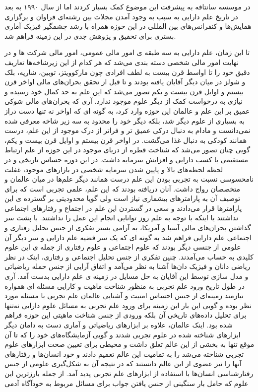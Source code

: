 \documentclass[a4paper,titlepage,12pt,fleqn,oneside]{report}
\begin{document}
در موسسه سانتافه\cite{santa}  به پیشرفت این موضوع کمک بسیار کردند اما از سال ۱۹۹۰ به بعد در تاریخ علم دارایی به سبب به وجود آمدن مجلات بین رشته‌ای فراوان و برگزاری همایش‌ها و کنفرانس‌های بین المللی در این حوزه همراه با رشد چشمگیر فیزیک آماری بستری برای تحقیق و پژوهش جدی در این زمینه فراهم شد.  




تا این زمان، علم  دارایی به سه طبقه ی امور مالی عمومی، امور مالی شرکت ها و در نهایت امور مالی شخصی دسته بندی می‌شد که هر کدام از این زیرشاخه‌ها تعاریف دقیق خود را تا اواسط قرن بیست به لطف افرادی چون مارکوویتز، توبین، شارپه، بلک و شولز در میان دیگر آقایان یافته بودند و تا قبل از تحقق بحران‌های مالی اواخر قرن بیستم و اوایل قرن بیست و یکم تصور می‌شد که این علم به حد کمال خود رسیده و نیازی به درخواست کمک از دیگر علوم موجود ندارد. آری که بحران‌های مالی شوکی عمیق بر این علم و عالمان این حوزه وارد کرد، به گونه ای که اواخر نه تنها دست دراز به بسیاری از علوم دیگر شد، بلکه دیگر خود را محدود به سه زیر شاخه معرفی شده نمی‌دانست و مادام به دنبال درکی عمیق تر و فراتر از درک موجود از این علم، درست همانند کودکی به دنبال غذا می‌گشت. در اواخر قرن بیستم و اوایل قرن بیست و یکم، گویی چنان تصور می‌شد که شناخت قطره از دریای موجود در این حوزه از علم ارتباط مستقیمی با کسب دارایی و افزایش سرمایه داشت. در این دوره حساس تاریخی و در لحظه لحظه‌های بالا و پایین شدن سرمایه شخصی در بازارهای موجود، غفلت نامحسوسی نسبت به تجربی بودن این علم درست همانند دیگر علم‌ها در میان عالمان و متخصصان رواج داشت. آنان دریافته بودند که این علم، علمی تجربی است که برای توصیف آن به پارامترهای بیشماری نیاز است ولی گویا محدودیتی بر گسترده ی این پارامترها قرار می‌دادند و سعی در گستردن این علم در اجتماع و رفتارهای اجتماعی نداشتند یا اینکه با توجه به علم روز توانایی انجام این عمل را نداشتند. با پشت سر گذاشتن بحران‌های مالی آسیا و آمریکا، به آرامی بستر تفکری از جنس تحلیل رفتاری و اجتماعی علم دارایی فراهم شد به گونه ای که یک سر قضیه علم دارایی و سر دیگر آن علومی از جنسی دیگر بودند که علوم اجتماعی و علوم رفتاری از جمله ی این علوم کلیدی به حساب می‌آمدند. چنین تفکری از جنس تحلیل اجتماعی و رفتاری، اینک در نظر ریاضی دانان و فیزیک دان‌ها آشنا به نظر می‌آمد و اتفاق آرایی از جنس حمله ریاضیاتی و مدل سازی توسط این آقایان به حل مسايل در زمینه ی علم دارایی بدست آمد. آری در طول تاریخ ورود علم تجربی به منظور شناخت ماهیت و کارایی مسئله ای همواره نیازمند زمینه‌ای از جنس احساس امنیت و آشنایی عالمان علم تجربی با مسئله مورد نظر بوده و گویی این بار این زمینه برای ورود علم تجربی به مسائل علوم دارایی نه‌تنها برای تحلیل داده‌های تاریخی آن بلکه ورودی از جنس شناخت ماهیتی این حوزه فراهم شده بود. اینک عالمان، علاوه بر ابزارهای ریاضیاتی و آماری دست به دامان دیگر ابزارهای شناخته شده در علوم تجربی شدند و گویی آزمایشگاه‌های خود را که تا آن موقع تنها به بخشی از این عالم تعلق داشت و محیطی برای تعیین صحت ابزارهای علوم تجربی شناخته می‌شد را به تمامیت این عالم تعمیم دادند و خود انسان‌ها و رفتارهای آنها را نیز عضوی از این عالم دانستند که در نتیجه آن به شکل‌گیری علومی از جنس رفتارشناسی انسان‌ها با استفاده از ابزارهای علم تجربی پدید آمد.  از جمله بارزترین این علوم که حامل بار سنگینی از جنس یافتن جواب برای مسائل مربوط به خودآگاه آدمی 
\end{document}
